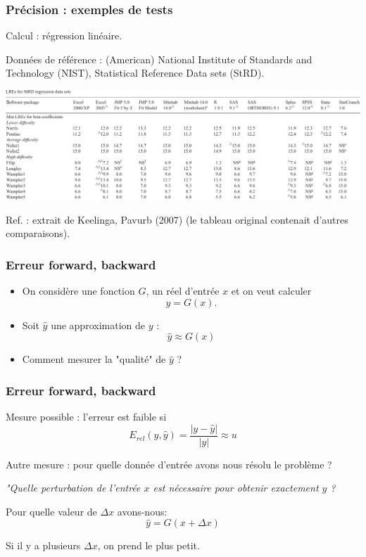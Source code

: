 \documentclass{beamer}
\begin{document}

\begin{frame}
\frametitle{Précision : exemples de tests}

Calcul : régression linéaire.

Données de référence : (American) National Institute of Standards and Technology (NIST), 
Statistical Reference Data sets (StRD).

\begin{center}
\includegraphics[width=1.\textwidth]{Keeling-Pavur-2007}
\end{center}

Ref. : extrait de Keelinga, Pavurb (2007) (le tableau original 
contenait d'autres comparaisons).

\end{frame}



\begin{frame}
\frametitle{Erreur forward, backward}

\begin{itemize}
\item On considère une fonction $G$, un réel d'entrée $x$ et 
on veut calculer 
$$
y=G(x).
$$
\item Soit $\hat{y}$ une approximation de $y$ :
$$
\hat{y} \approx G(x)
$$
\item Comment mesurer la "qualité" de $\hat{y}$ ?
\end{itemize}

\end{frame}


\begin{frame}
\frametitle{Erreur forward, backward}

Mesure possible : l'erreur est faible si 
$$
E_{rel}(y,\hat{y}) = \frac{|y-\hat{y}|}{|y|} \approx u
$$

Autre mesure : pour quelle donnée d'entrée avons nous résolu le problème ?

\emph{"Quelle perturbation de l'entrée $x$ est nécessaire 
pour obtenir exactement $\hat{y}$ ?}

Pour quelle valeur de $\Delta x$ avons-nous:
$$
\hat{y}=G(x+\Delta x)
$$

Si il y a plusieurs $\Delta x$, on prend le plus petit. 
\end{frame}
\end{document}
